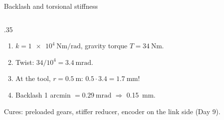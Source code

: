 \documentclass[aspectratio=169,10pt]{beamer}
\begin{document}
\begin{frame}{Backlash and torsional stiffness}
\begin{columns}[T]
\begin{column}{.35\textwidth}
\begin{defbox}
\begin{enumerate}
\item $k=\SI{1e4}{\newton\metre\per\radian}$, gravity torque $T=\SI{34}{\newton\metre}$.
\item Twist: $34/10^4=\SI{3.4}{\milli\radian}$.
\item At the tool, $r=\SI{0.5}{\metre}$: $0.5\cdot3.4=\SI{1.7}{\milli\metre}$!
\item Backlash 1 arcmin $=\SI{0.29}{\milli\radian}$ $\Rightarrow$ \SI{0.15}{\milli\metre}.
\end{enumerate}
\end{defbox}
\small Cures: preloaded gears, stiffer reducer, encoder on the link side (Day 9).
\end{column}
\end{columns}
\end{frame}

\end{document}
